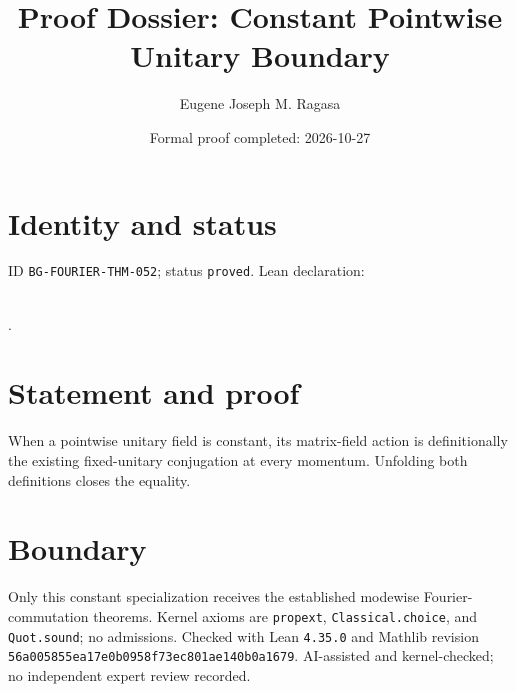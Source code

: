 \documentclass[11pt]{article}
\title{Proof Dossier: Constant Pointwise Unitary Boundary}\author{Eugene Joseph M. Ragasa}\date{Formal proof completed: 2026-10-27}
\begin{document}
\maketitle
\section{Identity and status}
ID \texttt{BG-FOURIER-THM-052}; status \texttt{proved}. Lean declaration:
\par{}\\
{\tiny{}}.
\section{Statement and proof}
When a pointwise unitary field is constant, its matrix-field action is definitionally the
existing fixed-unitary conjugation at every momentum. Unfolding both definitions closes
the equality.
\section{Boundary}
Only this constant specialization receives the established modewise Fourier-commutation
theorems. Kernel axioms are \texttt{propext}, \texttt{Classical.choice}, and
\texttt{Quot.sound}; no admissions. Checked with Lean \texttt{4.35.0} and Mathlib
revision \texttt{56a005855ea17e0b0958f73ec801ae140b0a1679}. AI-assisted and
kernel-checked; no independent expert review recorded.
\end{document}
